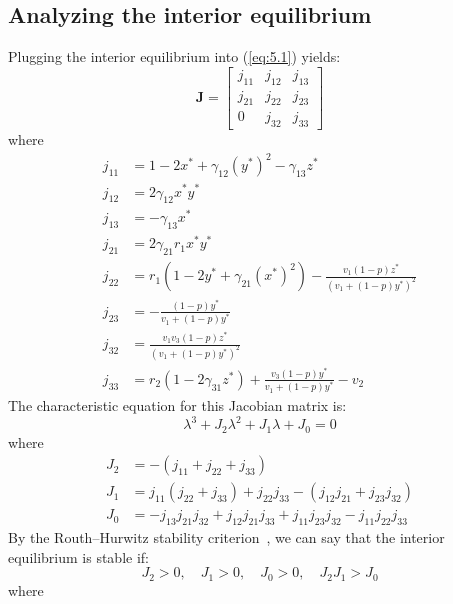 \subsection{Analyzing the interior equilibrium}\label{subsec:stability_interior_equilibrium}
Plugging the interior equilibrium into (\ref{eq:5.1}) yields:
\begin{equation}
    \textbf{J}=\begin{bmatrix}
        j_{11} & j_{12} & j_{13}\\
        j_{21} & j_{22} & j_{23}\\
        0 & j_{32} & j_{33}
    \end{bmatrix}
    \label{eq:5.16}
\end{equation}
where
\begin{align*}
    j_{11} &= 1-2x^*+\gamma_{12}\left(y^*\right)^2-\gamma_{13}z^*\\
    j_{12} &= 2\gamma_{12}x^*y^*\\
    j_{13} &= -\gamma_{13}x^*\\
    j_{21} &= 2\gamma_{21}r_1x^*y^*\\
    j_{22} &= r_1\left(1-2y^*+\gamma_{21}\left(x^*\right)^2\right)-\frac{v_1\left(1-p\right)z^*}{\left(v_1+\left(1-p\right)y^*\right)^2}\\
    j_{23} &= -\frac{\left(1-p\right)y^*}{v_1+\left(1-p\right)y^*}\\
    j_{32} &= \frac{v_1v_3\left(1-p\right)z^*}{\left(v_1+\left(1-p\right)y^*\right)^2}\\
    j_{33} &= r_2\left(1-2\gamma_{31}z^*\right)+\frac{v_3\left(1-p\right)y^*}{v_1+\left(1-p\right)y^*}-v_2
\end{align*}
The characteristic equation for this Jacobian matrix is:
\begin{equation}
    \lambda^3+J_2\lambda^2+J_1\lambda+J_0=0
    \label{eq:5.17}
\end{equation}
where
\begin{align*}
    J_2 &= -\left(j_{11}+j_{22}+j_{33}\right)\\
    J_1 &= j_{11}\left(j_{22}+j_{33}\right)+j_{22}j_{33}-\left(j_{12}j_{21}+j_{23}j_{32}\right)\\
    J_0 &= -j_{13}j_{21}j_{32}+j_{12}j_{21}j_{33}+j_{11}j_{23}j_{32}-j_{11}j_{22}j_{33}
\end{align*}
By the Routh–Hurwitz stability criterion~\cite{routh1877treatise}, we can say that the interior equilibrium is stable if:
\[
J_2>0,\quad J_1>0,\quad J_0>0,\quad J_2J_1>J_0
\]
where

